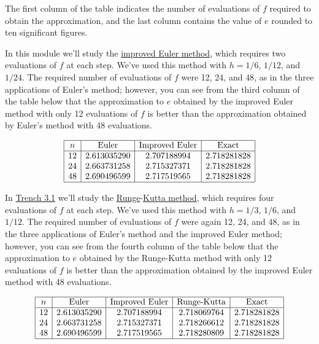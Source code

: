 \documentclass{ximera}
\begin{document}
The first column of the table
indicates
the number of evaluations of $f$ required to obtain the approximation, and
the last column contains the value of $e$ rounded to ten significant
figures.

In this module we'll study the
\href{http://www-history.mcs.st-and.ac.uk/Mathematicians/Euler.html}{improved Euler method}, which
requires two evaluations of $f$ at each step. We've used this method
with $h=1/6$, $1/12$, and $1/24$. The required number of evaluations
of $f$ were 12, 24, and $48$, as in the three applications of Euler's
method;     however, you can see from the third column of
the table below that the approximation to $e$ obtained by the
improved Euler method with only 12 evaluations of $f$ is better than
the approximation obtained by Euler's method with 48 evaluations.

\begin{center}
$$
\begin{array}{|c|c|c|c|}
\hline
n&
\text{Euler}&
\text{Improved Euler}&
\text{Exact}\\ \hline
12 & 2.613035290  &2.707188994  & 2.718281828 \\
24 & 2.663731258   &2.715327371   & 2.718281828 \\
48 & 2.690496599  &2.717519565  & 2.718281828
\\
\hline
\end{array}
$$
\end{center}

In \href{https://ximera.osu.edu/ode/main/eulersMethod/eulersMethod}{Trench 3.1} we'll study the
\href{http://www-history.mcs.st-and.ac.uk/Mathematicians/Runge.html}{Runge}-\href{http://www-history.mcs.st-and.ac.uk/Mathematicians/Kutta.html}{Kutta method},
which requires four evaluations of $f$ at each step. We've used this
method with $h=1/3$, $1/6$, and $1/12$. The required number of
evaluations of $f$ were again 12, 24, and $48$, as in the three
applications of Euler's method and the improved Euler method;     however,
you can see from the fourth column of the table below that the
approximation to $e$ obtained by the Runge-Kutta method with only 12
evaluations of $f$ is better than the approximation obtained by the
improved Euler method with 48 evaluations.

\begin{center}
$$
\begin{array}{|c|c|c|c|c|}
\hline
n&
\text{Euler}&
\text{Improved Euler}&
\text{Runge-Kutta}&
\text{Exact}\\ \hline
12 & 2.613035290  &2.707188994  &2.718069764 & 2.718281828 \\
24 & 2.663731258   &2.715327371   &2.718266612 & 2.718281828 \\
48 & 2.690496599  &2.717519565  &2.718280809 & 2.718281828
\\
\hline
\end{array}
$$
\end{center}
\end{document}
